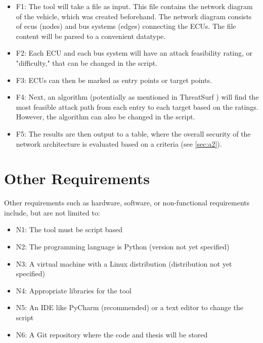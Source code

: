 \begin{itemize}

\item F1\label{sec:f1}: The tool will take a file as input. This file contains the network diagram of the vehicle, which was created beforehand. The network diagram consists of \gls{ecu}s (nodes) and bus systems (edges) connecting the ECUs. The file content will be parsed to a convenient datatype. 

\item F2\label{sec:f2}: Each ECU and each bus system will have an attack feasibility rating, or "difficulty," that can be changed in the script. 

\item F3\label{sec:f3}: ECUs can then be marked as entry points or target points. 

\item F4\label{sec:f4}: Next, an algorithm (potentially as mentioned in ThreatSurf \cite{threat_surf}) will find the most feasible attack path from each entry to each target based on the ratings. However, the algorithm can also be changed in the script. 

\item F5\label{sec:f5}: The results are then output to a table, where the overall security of the network architecture is evaluated based on a criteria (see \ref{sec:a2}).

\end{itemize}

\section{Other Requirements}
\label{sec:hardware-software}

Other requirements such as hardware, software, or non-functional requirements include, but are not limited to:

\begin{itemize}
	\item N1\label{sec:n1}: The tool must be script based
	\item N2\label{sec:n2}: The programming language is Python (version not yet specified)
	\item N3\label{sec:n3}: A virtual machine with a Linux distribution (distribution not yet specified)
	\item N4\label{sec:n4}: Appropriate libraries for the tool
	\item N5\label{sec:n5}: An IDE like PyCharm (recommended) or a text editor to change the script
	\item N6\label{sec:n6}: A Git repository where the code and thesis will be stored
\end{itemize}
